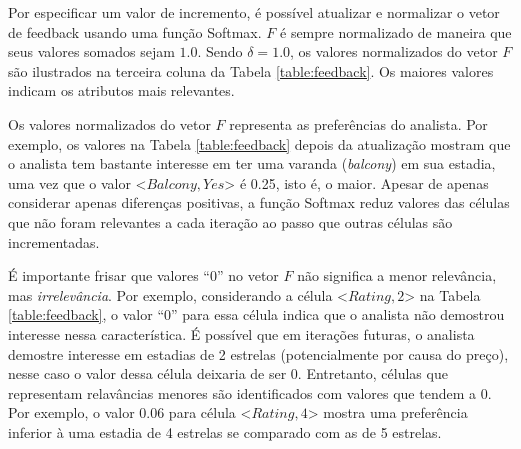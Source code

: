 Por especificar um valor de incremento, é possível atualizar e normalizar o vetor de feedback usando uma função Softmax. $F$ é sempre normalizado de maneira que seus valores somados sejam $1.0$. Sendo $\delta = 1.0$, os valores normalizados do vetor $F$ são ilustrados na terceira coluna da Tabela \ref{table:feedback}. Os maiores valores indicam os atributos mais relevantes.

Os valores normalizados do vetor $F$ representa as preferências do analista. Por exemplo, os valores na Tabela \ref{table:feedback} depois da atualização mostram que o analista tem bastante interesse em ter uma varanda ({\em balcony}) em sua estadia, uma vez que o valor \textless{}$Balcony, Yes$\textgreater{} é 0.25, isto é, o maior. Apesar de apenas considerar apenas diferenças positivas, a função Softmax reduz valores das células que não foram relevantes a cada iteração ao passo que outras células são incrementadas.

É importante frisar que valores ``0'' no vetor $F$ não significa a menor relevância, mas {\em irrelevância}. Por exemplo, considerando a célula \textless{}$Rating, 2$\textgreater{} na Tabela \ref{table:feedback}, o valor ``0'' para essa célula indica que o analista não demostrou interesse nessa característica. É possível que em iterações futuras, o analista demostre interesse em estadias de 2 estrelas (potencialmente por causa do preço), nesse caso o valor dessa célula deixaria de ser 0. Entretanto, células que representam relavâncias menores são identificados com valores que tendem a 0. Por exemplo, o valor 0.06 para célula \textless{}$Rating, 4$\textgreater{} mostra uma preferência inferior à uma estadia de 4 estrelas se comparado com as de 5 estrelas.

